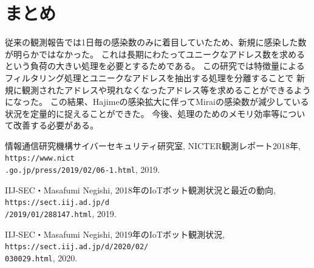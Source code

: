\documentclass[a4j,fleqn,10pt]{jarticle}
\begin{document}
\section{まとめ}
%
従来の観測報告では1日毎の感染数のみに着目していたため、新規に感染した数が明らかではなかった。
これは長期にわたってユニークなアドレス数を求めるという負荷の大きい処理を必要とするためである。
%
この研究では特徴量によるフィルタリング処理とユニークなアドレスを抽出する処理を分離することで
新規に観測されたアドレスや現れなくなったアドレス等を求めることができるようになった。
%
この結果、Hajimeの感染拡大に伴ってMiraiの感染数が減少している状況を定量的に捉えることができた。
%
今後、処理のためのメモリ効率等について改善する必要がある。

%
%
\begin{thebibliography}{3}

情報通信研究機構サイバーセキュリティ研究室, NICTER観測レポート2018年,
{\tt https://www.nict\\.go.jp/press/2019/02/06-1.html}, 2019.

\vspace{-1ex}
IIJ-SEC・Masafumi Negishi, 2018年のIoTボット観測状況と最近の動向,
{\tt https://sect.iij.ad.jp/d\\/2019/01/288147.html}, 2019.

\vspace{-1ex}
IIJ-SEC・Masafumi Negishi, 2019年のIoTボット観測状況, 
{\tt https://sect.iij.ad.jp/d/2020/02/\\030029.html}, 2020.

\end{thebibliography}
\end{document}
